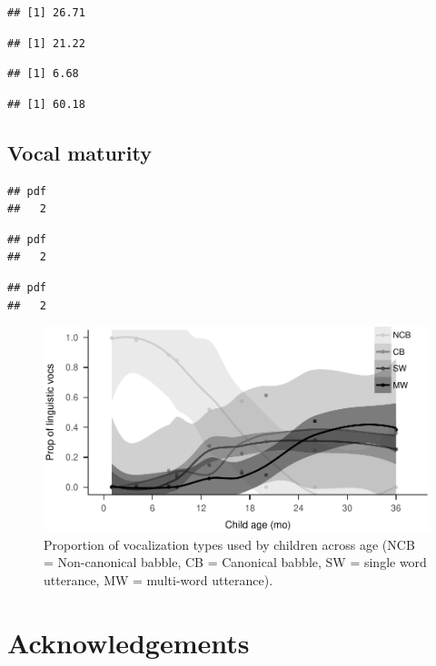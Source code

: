 \documentclass[floatsintext,man]{apa6}
\theoremstyle{definition}
\theoremstyle{definition}
\theoremstyle{definition}
\theoremstyle{remark}
\begin{document}
\begin{verbatim}
## [1] 26.71
\end{verbatim}

\begin{verbatim}
## [1] 21.22
\end{verbatim}

\begin{verbatim}
## [1] 6.68
\end{verbatim}

\begin{verbatim}
## [1] 60.18
\end{verbatim}

\subsection{Vocal maturity}\label{vocal-maturity}

\begin{verbatim}
## pdf 
##   2
\end{verbatim}

\begin{verbatim}
## pdf 
##   2
\end{verbatim}

\begin{verbatim}
## pdf 
##   2
\end{verbatim}

\begin{figure}
\centering
\includegraphics{Yeli-CLE_files/figure-latex/fig6-1.pdf}
\caption{\label{fig:fig6}Proportion of vocalization types used by children
across age (NCB = Non-canonical babble, CB = Canonical babble, SW =
single word utterance, MW = multi-word utterance).}
\end{figure}

\section{Acknowledgements}\label{acknowledgements}
\end{document}
